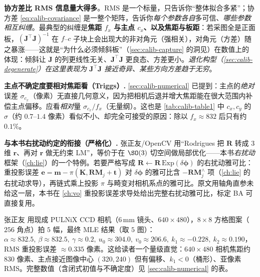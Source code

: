 \begin{insight}
\textbf{协方差比 RMS 信息量大得多}。RMS 是一个标量，只告诉你“整体拟合多紧”；协方差 \cref{eq:calib-covariance} 是一整个矩阵，告诉你\emph{每个参数各自}多可信、\emph{哪些参数相互纠缠}。最典型的纠缠是\textbf{焦距 $f_x$ 与主点 $c_x$、以及焦距与板距}：若采图全是正面板，$(\mathbf{J}^\top\mathbf{J})^{-1}$ 在 $f$--$c$ 子块上会出现大的非对角元（强相关），对角元（方差）随之暴涨——这就是“为什么必须倾斜板”（\cref{sec:calib-capture} 的洞见）在数值上的体现：倾斜让 $\mathbf{J}$ 的列更线性无关、$\mathbf{J}^\top\mathbf{J}$ 更良态、方差更小。\emph{退化构型（\cref{sec:calib-degenerate}）在这里表现为 $\mathbf{J}^\top\mathbf{J}$ 接近奇异、某些方向方差趋于无穷}。
\end{insight}

\begin{note}
\textbf{主点不确定度要相对焦距看（Triggs\cite{triggs1998autocalib}）.}\;
\cref{sec:calib-numerical} 已提到：主点的\emph{绝对}误差 $\sigma_{c_x}$（像素）无直接几何意义，因为把相机后退并增大焦距能在很大范围内补偿主点偏移。应看\emph{相对}量 $\sigma_{c_x}/f_x$（无量纲）。这也是 \cref{tab:calib-table1} 中 $c_x,c_y$ 的 $\sigma$（约 $0.7$--$1.4$ 像素）看似不小、却完全可接受的原因：除以 $f_x\approx832$ 后只有约 $0.1\%$。
\end{note}

\begin{note}
\textbf{与本书右扰动约定的衔接（严格化）.}\;
张正友/OpenCV 用“Rodrigues 把 $\mathbf{R}$ 转成 $3$ 维 $\mathbf{r}$、再对 $\mathbf{r}$ 做无约束 LM”，等价于在 $\SO(3)$ 切空间做局部优化——本书\emph{右扰动}框架（\cref{ch:lie}）的一个特例。若要严格写成 $\mathbf{R}\leftarrow\mathbf{R}\,\mathrm{Exp}(\delta\boldsymbol{\phi})$ 的右扰动雅可比：重投影误差 $\mathbf{e}=\mathbf{m}-\pi(\mathbf{K},\mathbf{R}\mathbf{M}_j+\mathbf{t})$ 对 $\delta\boldsymbol{\phi}$ 的雅可比含 $-\mathbf{R}\mathbf{M}_j^\wedge$ 项（\cref{ch:lie} 的右扰动求导），再链式乘上投影 $\pi$ 与畸变对相机系点的雅可比。原文用轴角直参未给这一层，本书在 \cref{ch:vo} 重投影误差求导处给出完整右扰动雅可比，标定 BA 可直接复用。
\end{note}

\begin{example}[一个真实标定结果长什么样]\label{ex:calib-real-result}
张正友\cite{zhang2000calibration} 用现成 PULNiX CCD 相机（$6\,\mathrm{mm}$ 镜头、$640\times480$），$8\times8$ 方格图案（$256$ 角点）拍 $5$ 幅，最终 MLE 结果（取 $5$ 图）：$\alpha\approx832.5,\ \beta\approx832.5,\ \gamma\approx0.2,\ u_0\approx304.0,\ v_0\approx206.6,\ k_1\approx-0.228,\ k_2\approx0.190$，RMS 重投影误差 $\approx0.335$ 像素。这给读者一个量级直觉：$640\times480$ 相机焦距约 $830$ 像素、主点接近图像中心 $(320,240)$ 但有偏移、$k_1<0$（桶形）、亚像素 RMS。完整数值（含闭式初值与不确定度）见 \cref{sec:calib-numerical} 的表。
\end{example}


